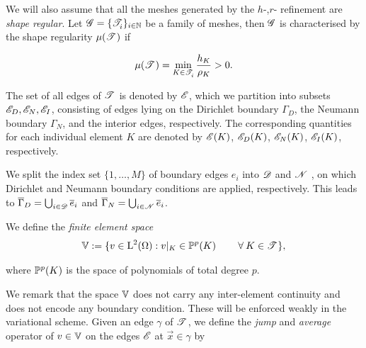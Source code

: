 \documentclass[a4paper,11pt]{article}
\begin{document}
{We will also assume that all the meshes generated by the $h$-,$r$- refinement are \textit{shape regular}. Let $\mathscr G = \{ \mathscr T^{}_{i} \}_{i\in \mathbb N}$ be a family of meshes, then $\mathscr G$ is characterised by the shape regularity $\mu(\mathscr T^{})$ if
    
\begin{equation}
        \mu(\mathscr T^{}) = \min_{K\in \mathscr T^{}_{i}}\frac{h_{K}}{\rho_{K}} > 0.
\label{eq:shape_regularity}
\end{equation}
    
The set of all edges of $\mathscr T^{}$ is denoted by $\mathscr E$, which we partition into subsets $\mathscr E_{D}, \mathscr E_{N}, \mathscr E_{I}$, consisting of edges lying on the Dirichlet boundary $\Gamma_{D}$, the Neumann boundary $\Gamma_{N}$, and the interior edges, respectively. The corresponding quantities for each individual element $K$ are denoted by $\mathscr E(K)$, $\mathscr E_{D}(K)$, $\mathscr E_{N}(K)$, $\mathscr E_{I}(K)$, respectively. 

We split the index set $\{1,\dots,M\}$ of boundary edges $e_{i}$ into $\mathscr D$ and $\mathscr N$ , on which Dirichlet and Neumann boundary conditions are applied, respectively. This leads to $\overline{\Gamma}_{D} = \bigcup_{i\in \mathscr D}\overline{e}_{i}$ and $\overline{\Gamma}_{N} = \bigcup_{i\in \mathscr N}\overline{e}_{i}$. 

We define the \emph{finite element space}
\begin{gather}
  \label{eqn:def:finite-element-space}
  \mathbb V :=   \{ v\in \operatorname L^{2}(\Omega): v|_K \in \mathbb P^{p} (K) \quad \quad\:\forall\: K \in \mathscr T^{} \},
\end{gather}

where $\mathbb P^{p} (K)$ is the space of polynomials of total degree $p$.

We remark that the space $\mathbb V$ does not carry any inter-element continuity and does not encode any boundary condition. These will be enforced weakly in the variational scheme. 
Given an edge $\gamma$ of $\mathscr T^{}$, we define the \textit{jump} and \textit{average} operator of $v \in \mathbb V$ on the edges $\mathscr E$ at $\vec{x} \in \gamma$  by

}
\end{document}
